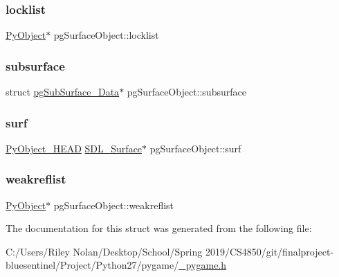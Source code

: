 \mbox{\label{structpg_surface_object_ac8e1e1eec4639dd65318ef954e73ef94}} 
\subsubsection{\texorpdfstring{locklist}{locklist}}
{\footnotesize\ttfamily \mbox{\hyperlink{_python27_2object_8h_aadc84ac7aed2cfa6f20c25f62bf3dac7}{Py\+Object}}$\ast$ pg\+Surface\+Object\+::locklist}

\mbox{\label{structpg_surface_object_af88de874c2a9e1616104820e5050d979}} 
\subsubsection{\texorpdfstring{subsurface}{subsurface}}
{\footnotesize\ttfamily struct \mbox{\hyperlink{structpg_sub_surface___data}{pg\+Sub\+Surface\+\_\+\+Data}}$\ast$ pg\+Surface\+Object\+::subsurface}

\mbox{\label{structpg_surface_object_abb9d6d94832d8c7ab74248354b2bf6cf}} 
\subsubsection{\texorpdfstring{surf}{surf}}
{\footnotesize\ttfamily \mbox{\hyperlink{_python27_2object_8h_a0bf35c1f3ea13f925de94d8593db3b7e}{Py\+Object\+\_\+\+H\+E\+AD}} \mbox{\hyperlink{struct_s_d_l___surface}{S\+D\+L\+\_\+\+Surface}}$\ast$ pg\+Surface\+Object\+::surf}

\mbox{\label{structpg_surface_object_a1918eaf635affb55cbaccbffc0a75bcf}} 
\subsubsection{\texorpdfstring{weakreflist}{weakreflist}}
{\footnotesize\ttfamily \mbox{\hyperlink{_python27_2object_8h_aadc84ac7aed2cfa6f20c25f62bf3dac7}{Py\+Object}}$\ast$ pg\+Surface\+Object\+::weakreflist}



The documentation for this struct was generated from the following file\+:\begin{DoxyCompactItemize}
\item 
C\+:/\+Users/\+Riley Nolan/\+Desktop/\+School/\+Spring 2019/\+C\+S4850/git/finalproject-\/bluesentinel/\+Project/\+Python27/pygame/\mbox{\hyperlink{__pygame_8h}{\+\_\+pygame.\+h}}\end{DoxyCompactItemize}
